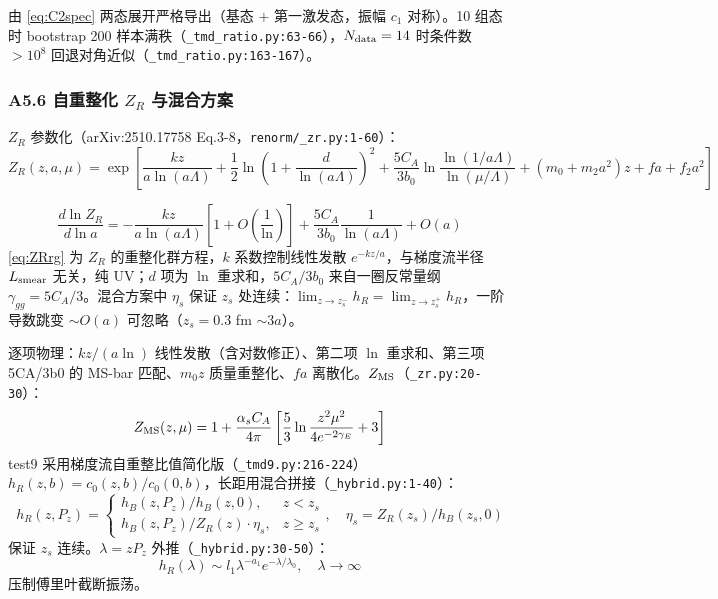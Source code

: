 \documentclass[UTF8]{ctexart}
\begin{document}
由 \eqref{eq:C2spec} 两态展开严格导出（基态 $+$ 第一激发态，振幅 $c_1$ 对称）。10 组态时 bootstrap 200 样本满秩（\texttt{\nolinkurl{\_tmd\_ratio.py:63-66}}），$N_{\rm data}=14$ 时条件数 $>10^8$ 回退对角近似（\texttt{\nolinkurl{\_tmd\_ratio.py:163-167}}）。

\subsubsection{A5.6 自重整化 $Z_R$ 与混合方案}
$Z_R$ 参数化（arXiv:2510.17758 Eq.3-8，\texttt{\nolinkurl{renorm/\_zr.py:1-60}}）：
\begin{equation}
Z_R(z,a,\mu)=\exp\left[\frac{kz}{a\ln(a\Lambda)}+\frac12\ln\!\left(1+\frac{d}{\ln(a\Lambda)}\right)^2+\frac{5C_A}{3b_0}\ln\frac{\ln(1/a\Lambda)}{\ln(\mu/\Lambda)}+(m_0+m_2a^2)z+fa+f_2a^2\right]
\label{eq:ZR}
\end{equation}

\begin{equation}
\frac{d\ln Z_R}{d\ln a}= -\frac{kz}{a\ln(a\Lambda)}\left[1+O\left(\frac1{\ln}\right)\right] +\frac{5C_A}{3b_0}\frac1{\ln(a\Lambda)}+O(a)
\label{eq:ZRrg}
\end{equation}
\eqref{eq:ZRrg} 为 $Z_R$ 的重整化群方程，$k$ 系数控制线性发散 $e^{-kz/a}$，与梯度流半径 $L_{\rm smear}$ 无关，纯 UV；$d$ 项为 $\ln$ 重求和，$5C_A/3b_0$ 来自一圈反常量纲 $\gamma_{gg}=5C_A/3$。混合方案中 $\eta_s$ 保证 $z_s$ 处连续：$\lim_{z\to z_s^-}h_R=\lim_{z\to z_s^+}h_R$，一阶导数跳变 $\sim O(a)$ 可忽略（$z_s=0.3$ fm $\sim3a$）。

逐项物理：$kz/(a\ln)$ 线性发散（含对数修正）、第二项 $\ln$ 重求和、第三项 5CA/3b0 的 MS-bar 匹配、$m_0z$ 质量重整化、$fa$ 离散化。$Z_{\rm MS}$（\texttt{\nolinkurl{\_zr.py:20-30}}）：
\begin{equation}
Z_{\rm MS}(z,\mu)=1+\frac{\alpha_s C_A}{4\pi}\left[\frac53\ln\frac{z^2\mu^2}{4e^{-2\gamma_E}}+3\right]
\label{eq:ZMS}
\end{equation}
test9 采用梯度流自重整比值简化版（\texttt{\nolinkurl{\_tmd9.py:216-224}}）$h_R(z,b)=c_0(z,b)/c_0(0,b)$，长距用混合拼接（\texttt{\nolinkurl{\_hybrid.py:1-40}}）：
\begin{equation}
h_R(z,P_z)=\begin{cases} h_B(z,P_z)/h_B(z,0), & z<z_s \\ h_B(z,P_z)/Z_R(z)\cdot\eta_s, & z\ge z_s \end{cases},\quad \eta_s=Z_R(z_s)/h_B(z_s,0)
\label{eq:hybrid}
\end{equation}
保证 $z_s$ 连续。$\lambda=zP_z$ 外推（\texttt{\nolinkurl{\_hybrid.py:30-50}}）：
\begin{equation}
h_R(\lambda)\sim l_1\lambda^{-a_1}e^{-\lambda/\lambda_0},\quad \lambda\to\infty
\label{eq:lambdaExtrap}
\end{equation}
压制傅里叶截断振荡。
\end{document}
